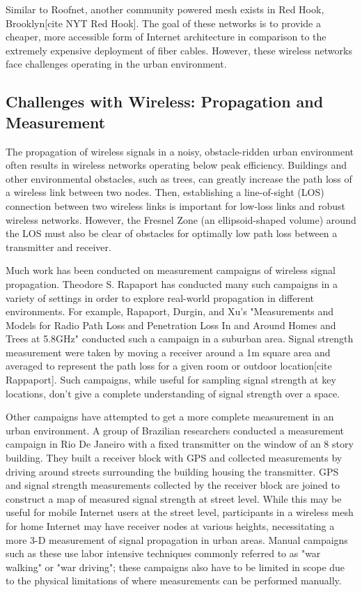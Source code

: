 \documentclass[pageno]{jpaper}
\begin{document}
Similar to Roofnet, another community powered mesh exists in Red Hook, Brooklyn[cite NYT Red Hook]. The goal of these networks is to provide a cheaper, more accessible form of Internet architecture in comparison to the extremely expensive deployment of fiber cables. However, these wireless networks face challenges operating in the urban environment.

\subsection{Challenges with Wireless: Propagation and Measurement}
The propagation of wireless signals in a noisy, obstacle-ridden urban environment often results in wireless networks operating below peak efficiency. Buildings and other environmental obstacles, such as trees, can greatly increase the path loss of a wireless link between two nodes. Then, establishing a line-of-sight (LOS) connection between two wireless links is important for low-loss links and robust wireless networks. However, the Fresnel Zone (an ellipsoid-shaped volume) around the LOS must also be clear of obstacles for optimally low path loss between a transmitter and receiver. 

Much work has been conducted on measurement campaigns of wireless signal propagation. Theodore S. Rapaport has conducted many such campaigns in a variety of settings in order to explore real-world propagation in different environments. For example, Rapaport, Durgin, and Xu's "Measurements and Models for Radio Path Loss and Penetration Loss In and Around Homes and Trees at 5.8GHz" conducted such a campaign in a suburban area. Signal strength measurement were taken by moving a receiver around a 1m square area and averaged to represent the path loss for a given room or outdoor location[cite Rappaport]. Such campaigns, while useful for sampling signal strength at key locations, don't give a complete understanding of signal strength over a space. 

Other campaigns have attempted to get a more complete measurement in an urban environment. A group of Brazilian researchers conducted a measurement campaign in Rio De Janeiro with a fixed transmitter on the window of an 8 story building. They built a receiver block with GPS and collected measurements by driving around streets surrounding the building housing the transmitter. GPS and signal strength measurements collected by the receiver block are joined to construct a map of measured signal strength at street level. While this may be useful for mobile Internet users at the street level, participants in a wireless mesh for home Internet may have receiver nodes at various heights, necessitating a more 3-D measurement of signal propagation in urban areas. Manual campaigns such as these use labor intensive techniques commonly referred to as "war walking" or "war driving"; these campaigns also have to be limited in scope due to the physical limitations of where measurements can be performed manually. 
\end{document}
